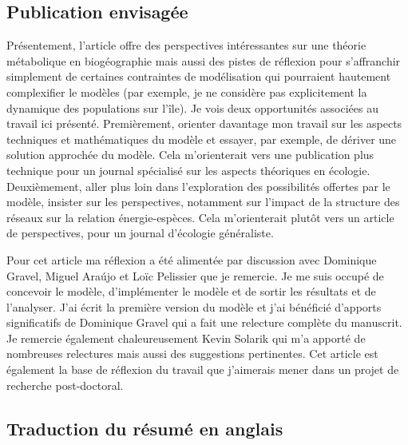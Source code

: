 \subsection{Publication envisagée}

Présentement, l'article offre des perspectives intéressantes sur une
théorie métabolique en biogéographie mais aussi des pistes de réflexion
pour s'affranchir simplement de certaines contraintes de modélisation
qui pourraient hautement complexifier le modèles (par exemple, je ne considère
pas explicitement la dynamique des populations sur l'île). Je vois deux opportunités
associées au travail ici présenté. Premièrement, orienter davantage mon travail
sur les aspects techniques et mathématiques du modèle et essayer,
par exemple, de dériver une solution approchée du modèle.
Cela m'orienterait vers une publication plus technique
pour un journal spécialisé sur les aspects théoriques en écologie. Deuxièmement,
aller plus loin dans l'exploration des possibilités offertes par le modèle,
insister sur les perspectives, notamment sur l'impact de la structure des
réseaux sur la relation énergie-espèces. Cela m'orienterait plutôt vers
un article de perspectives, pour un journal d’écologie généraliste.

Pour cet article ma réflexion a été alimentée par discussion avec Dominique
Gravel, Miguel Araújo et Loïc Pelissier que je remercie. Je me suis occupé de
concevoir le modèle, d'implémenter le modèle et de sortir les résultats et de
l'analyser. J'ai écrit la première version du modèle et j'ai bénéficié d'apports
significatifs de Dominique Gravel qui a fait une relecture complète du
manuscrit. Je remercie également chaleureusement Kevin Solarik qui m'a apporté
de nombreuses relectures mais aussi des suggestions pertinentes. Cet article est
également la base de réflexion du travail que j’aimerais mener dans un projet
de recherche post-doctoral.



\subsection{Traduction du résumé en anglais}

